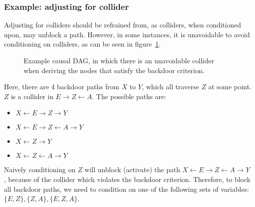 \documentclass{article}
\begin{document}
\subsubsection{Example: adjusting for collider}

Adjusting for colliders should be refrained from, as colliders, when conditioned upon, may unblock a path. However, in some instances, it is unavoidable to avoid conditioning on colliders, as can be seen in figure~\ref{fig:bdex2}. 

\begin{figure}[H]
    \centering
    
    \caption{Example causal DAG, in which there is an unavoidable collider when deriving the nodes that satisfy the backdoor criterion.}
    \label{fig:bdex2}
\end{figure}

\noindent Here, there are 4 backdoor paths from $X$ to $Y$, which all traverse $Z$ at some point. $Z$ is a collider in $E \rightarrow Z \leftarrow A$. The possible paths are:
\begin{itemize}
    \item[] $X \leftarrow E \rightarrow Z \rightarrow Y$
    \item[] $X \leftarrow E \rightarrow Z \leftarrow A \rightarrow Y$
    \item[] $X \leftarrow Z \rightarrow Y$
    \item[] $X \leftarrow Z \leftarrow A \rightarrow Y$
\end{itemize}
\noindent Naively conditioning on $Z$ will unblock (activate) the path $X \leftarrow E \rightarrow Z \leftarrow A \rightarrow Y$, because of the collider which violates the backdoor criterion. Therefore, to block all backdoor paths, we need to condition on one of the following sets of variables: $\{E, Z\}, \{Z, A\}, \{E, Z, A\}$. 
\end{document}
